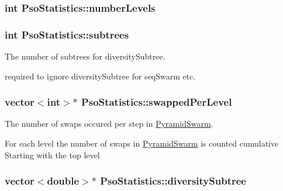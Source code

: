 \hypertarget{classPsoStatistics_9f08ad8f8051708b7eb1783cbe17219e}{
\subsubsection{\setlength{\rightskip}{0pt plus 5cm}int {\bf PsoStatistics::numberLevels}}}
\label{classPsoStatistics_9f08ad8f8051708b7eb1783cbe17219e}


\hypertarget{classPsoStatistics_2116d71d39a38afe58c096278ab054b3}{
\subsubsection{\setlength{\rightskip}{0pt plus 5cm}int {\bf PsoStatistics::subtrees}}}
\label{classPsoStatistics_2116d71d39a38afe58c096278ab054b3}


The number of subtrees for diversitySubtree. 

required to ignore diversitySubtree for seqSwarm etc. \hypertarget{classPsoStatistics_77332ba8e781b613b82602e0ddbbe8fe}{
\subsubsection{\setlength{\rightskip}{0pt plus 5cm}vector$<$int$>$$\ast$ {\bf PsoStatistics::swappedPerLevel}}}
\label{classPsoStatistics_77332ba8e781b613b82602e0ddbbe8fe}


The number of swaps occured per step in \hyperlink{classPyramidSwarm}{PyramidSwarm}. 

For each level the number of swaps in \hyperlink{classPyramidSwarm}{PyramidSwarm} is counted cumulative Starting with the top level \hypertarget{classPsoStatistics_08cbf891f34ca4f5b71545588d30cb9d}{
\subsubsection{\setlength{\rightskip}{0pt plus 5cm}vector$<$double$>$$\ast$ {\bf PsoStatistics::diversitySubtree}}}
\label{classPsoStatistics_08cbf891f34ca4f5b71545588d30cb9d}


